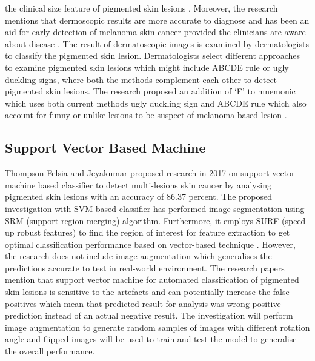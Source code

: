 the clinical size feature of pigmented skin lesions \citep{doi:10.1177/030089160409000125}.
Moreover, the research mentions that dermoscopic results are more accurate to diagnose 
and has been an aid for early detection of melanoma skin cancer 
provided the clinicians are aware about disease \citep{doi:10.1177/030089160409000125}.
The result of dermatoscopic images is examined by dermatologists to classify the pigmented skin lesion.
Dermatologists select different approaches to examine pigmented
skin lesions which might include ABCDE rule or ugly duckling signs, 
where both the methods complement each other to detect pigmented skin lesions. 
The research proposed an addition of ‘F’ to mnemonic which uses both 
current methods ugly duckling sign and ABCDE rule which also account 
for funny or unlike lesions to be suspect of melanoma based lesion \citep{doi:10.1177/030089160409000125}.

\subsection{Support Vector Based Machine}
Thompson Felsia and Jeyakumar proposed research in 2017 on 
support vector machine based classifier to detect multi-lesions skin cancer by analysing pigmented skin lesions with an accuracy of 86.37 percent.
The proposed investigation with SVM based classifier has performed image segmentation using SRM (support region merging) algorithm. Furthermore, it employs SURF (speed up robust features) to find the region 
of interest for feature extraction to get optimal classification performance based on vector-based technique \citep{thompson2017vector}. 
However, the research does not include image augmentation which generalises the predictions accurate to test in 
real-world environment. The research papers mention that support vector machine for automated classification of pigmented skin lesions is sensitive to the artefacts and can 
potentially increase the false positives which mean that predicted result for analysis was wrong positive prediction instead of an actual negative result. The investigation will perform image augmentation to generate random 
samples of images with different rotation angle and flipped images will be used to train and test the model to generalise the overall performance.

